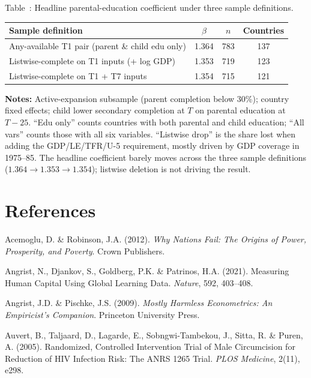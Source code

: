 \documentclass[12pt,letterpaper]{article}
\begin{document}
{\label{tab:listwise-stress}Table~\thetable: Headline parental-education coefficient under three sample definitions.

\begin{center}
\begin{tabular}{@{}lccc@{}}
\toprule
Sample definition & $\beta$ & $n$ & Countries \\
\midrule
Any-available T1 pair (parent \& child edu only) & 1.364 & 783 & 137 \\
Listwise-complete on T1 inputs (+ log GDP)       & 1.353 & 719 & 123 \\
Listwise-complete on T1 + T7 inputs              & 1.354 & 715 & 121 \\
\bottomrule
\end{tabular}
\end{center}

\begin{minipage}{\dimexpr\textwidth-2em}
\scriptsize
\textbf{Notes:} Active-expansion subsample (parent completion below
30\%); country fixed effects; child lower secondary completion at $T$
on parental education at $T{-}25$. ``Edu only'' counts countries with
both parental and child education; ``All vars'' counts those with all
six variables. ``Listwise drop'' is the share lost when adding the
GDP/LE/TFR/U-5 requirement, mostly driven by GDP coverage in 1975--85.
The headline coefficient barely moves across the three sample
definitions ($1.364 \to 1.353 \to 1.354$); listwise deletion is not
driving the result.
\end{minipage}

}

\section*{References}\label{references}

Acemoglu, D. \& Robinson, J.A. (2012). \emph{Why Nations Fail: The
Origins of Power, Prosperity, and Poverty}. Crown Publishers.

Angrist, N., Djankov, S., Goldberg, P.K. \& Patrinos, H.A. (2021).
Measuring Human Capital Using Global Learning Data. \emph{Nature}, 592,
403--408.

Angrist, J.D. \& Pischke, J.S. (2009). \emph{Mostly Harmless
Econometrics: An Empiricist's Companion}. Princeton University Press.

Auvert, B., Taljaard, D., Lagarde, E., Sobngwi-Tambekou, J., Sitta, R.
\& Puren, A. (2005). Randomized, Controlled Intervention Trial of Male
Circumcision for Reduction of HIV Infection Risk: The ANRS 1265 Trial.
\emph{PLOS Medicine}, 2(11), e298.
\end{document}
